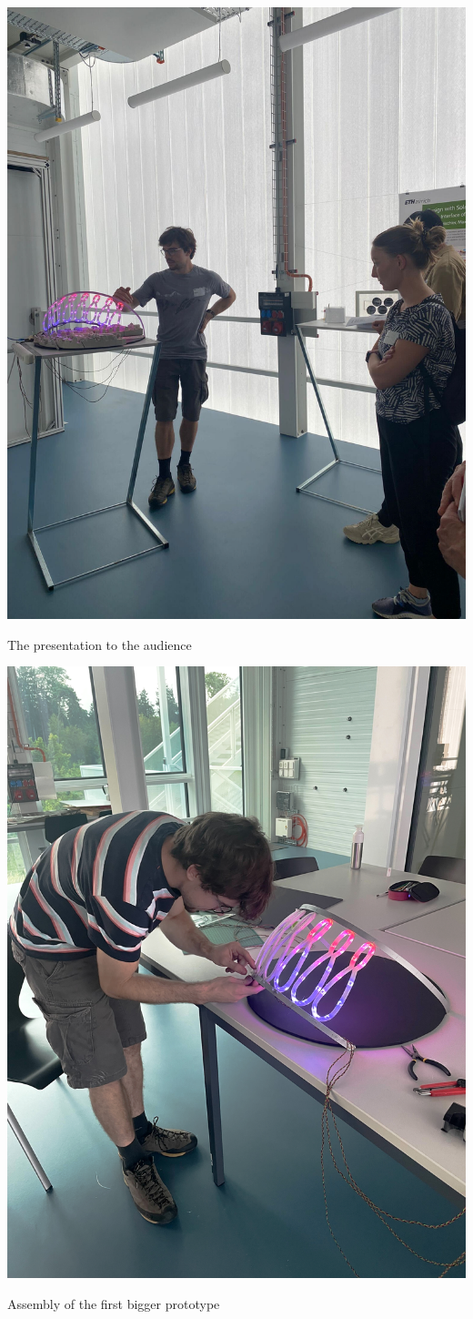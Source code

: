 \documentclass[a4paper,9pt]{article}
\begin{document}
    \begin{minipage}{0.48\linewidth}
        \centering
        \includegraphics[width=.59\linewidth]{Images/b9d45c07-98a5-4d7e-ab01-3ffce05beceb.jpg}
        \caption{The presentation to the audience}
        
    \end{minipage}
     \hfill
    \begin{minipage}{0.48\linewidth}
         \centering
        \includegraphics[width=.59\linewidth]{Images/img_6556.jpg}
        \caption{Assembly of the first bigger prototype}
        
    \end{minipage}
    
\end{document}
